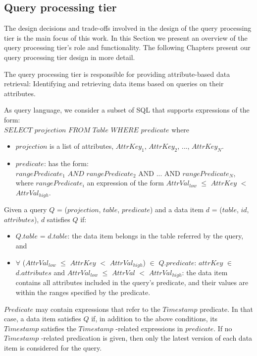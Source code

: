 \subsection{Query processing tier}
\label{subsec:query_prcessing_tier}
The design decisions and trade-offs involved in the design of the query processing tier is the main focus of this work.
In this Section we present an overview of the query processing tier's role and functionality.
The following Chapters present our query processing tier design in more detail.

The query processing tier is responsible for providing attribute-based data retrieval:
Identifying and retrieving data items based on queries on their attributes.

As query language, we consider a subset of SQL that supports expressions of the form: \\

\noindent
$SELECT$ $projection$ $FROM$ $Table$ $WHERE$ $predicate$
\noindent
where
\begin{itemize}
  \item $projection$ is a list of attributes, $AttrKey_1$, $AttrKey_2$, ..., $AttrKey_N$.
  \item $predicate$: has the form: \\ $rangePredicate_1$ $AND$ $rangePredicate_2$ AND ... AND $rangePredicate_N$, \\
  where $rangePredicate_i$ an expression of the form $AttrVal_{low}$ $\leq$ $AttrKey$ $<$ $AttrVal_{high}$.
\end{itemize}

Given a query $Q$ = ($projection$, $table$, $predicate$)
and a data item $d$ = ($table$, $id$, $attributes$), $d$ satisfies $Q$ if:
\begin{itemize}
  \item $Q.table$ = $d.table$: the data item belongs in the table referred by the query, and
  \item $\forall$ ($AttrVal_{low}$ $\leq$ $AttrKey$ $<$ $AttrVal_{high}$) $\in$ $Q.predicate$:
  $attrKey$ $\in$ $d.attributes$ and $AttrVal_{low}$ $\leq$ $AttrVal$ $<$ $AttrVal_{high}$:
  the data item contains all attributes included in the query's predicate, and their values are within the ranges
  specified by the predicate.
\end{itemize}

$Predicate$ may contain expressions that refer to the $Timestamp$ predicate.
In that case, a data item satisfies $Q$ if, in addition to the above conditions, its $Timestamp$ satisfies the
$Timestamp$ -related expressions in $predicate$.
If no $Timestamp$ -related predication is given, then only the latest version of each data item is considered for the
query.


